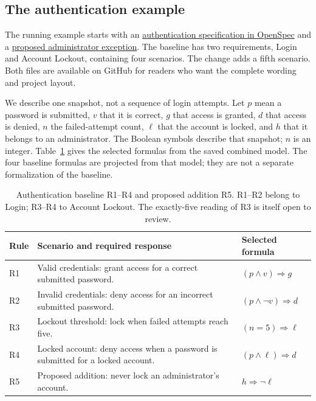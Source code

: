 \subsection{The authentication example}

The running example starts with an \href{\authbaseurl}{authentication specification in OpenSpec} and a \href{\authchangeurl}{proposed administrator exception}. The baseline has two requirements, Login and Account Lockout, containing four scenarios. The change adds a fifth scenario. Both files are available on GitHub for readers who want the complete wording and project layout.

We describe one snapshot, not a sequence of login attempts. Let $p$ mean a password is submitted, $v$ that it is correct, $g$ that access is granted, $d$ that access is denied, $n$ the failed-attempt count, $\ell$ that the account is locked, and $h$ that it belongs to an administrator. The Boolean symbols describe that snapshot; $n$ is an integer. Table~\ref{tab:auth-baseline} gives the selected formulas from the saved combined model. The four baseline formulas are projected from that model; they are not a separate formalization of the baseline.

\begin{table}[H]
\centering
\begin{tabularx}{\linewidth}{@{}lXl@{}}
\toprule
Rule & Scenario and required response & Selected formula \\
\midrule
R1 & Valid credentials: grant access for a correct submitted password. & $(p\land v)\Rightarrow g$ \\
R2 & Invalid credentials: deny access for an incorrect submitted password. & $(p\land\neg v)\Rightarrow d$ \\
R3 & Lockout threshold: lock when failed attempts reach five. & $(n=5)\Rightarrow\ell$ \\
R4 & Locked account: deny access when a password is submitted for a locked account. & $(p\land\ell)\Rightarrow d$ \\
\midrule
R5 & Proposed addition: never lock an administrator's account. & $h\Rightarrow\neg\ell$ \\
\bottomrule
\end{tabularx}
\caption{Authentication baseline R1--R4 and proposed addition R5. R1--R2 belong to Login; R3--R4 to Account Lockout. The exactly-five reading of R3 is itself open to review.}\label{tab:auth-baseline}
\end{table}


